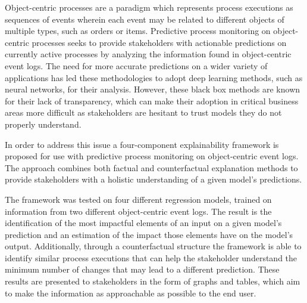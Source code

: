 Object-centric processes are a paradigm which represents process executions as sequences of events wherein each event may be related to different objects of multiple types, such as orders or items. Predictive process monitoring on object-centric processes seeks to provide stakeholders with actionable predictions on currently active processes by analyzing the information found in object-centric event logs. The need for more accurate predictions on a wider variety of applications has led these methodologies to adopt deep learning methods, such as neural networks, for their analysis. However, these black box methods are known for their lack of transparency, which can make their adoption in critical business areas more difficult as stakeholders are hesitant to trust models they do not properly understand.

In order to address this issue a four-component explainability framework is proposed for use with predictive process monitoring on object-centric event logs. The approach combines both factual and counterfactual explanation methods to provide stakeholders with a holistic understanding of a given model's predictions.

The framework was tested on four different regression models, trained on information from two different object-centric event logs. The result is the identification of the most impactful elements of an input on a given model's prediction and an estimation of the impact those elements have on the model's output. Additionally, through a counterfactual structure the framework is able to identify similar process executions that can help the stakeholder understand the minimum number of changes that may lead to a different prediction. These results are presented to stakeholders in the form of graphs and tables, which aim to make the information as approachable as possible to the end user.